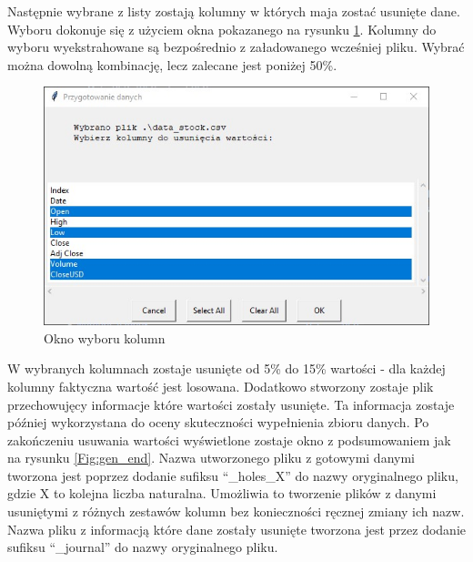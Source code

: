 \documentclass[12pt,twoside]{article}
\begin{document}
Następnie wybrane z listy zostają kolumny w których maja zostać usunięte dane.
Wyboru dokonuje się z użyciem okna pokazanego na rysunku \ref{Fig:gen_col}.
Kolumny do wyboru wyekstrahowane są bezpośrednio z załadowanego wcześniej pliku.
Wybrać można dowolną kombinację, lecz zalecane jest poniżej 50\%.

\begin{figure}[ht]
    \centering
    \includegraphics[width=12cm]{img/03.jpg}
    \caption{Okno wyboru kolumn}
    \label{Fig:gen_col}
\end{figure}
\FloatBarrier

W wybranych kolumnach zostaje usunięte od 5\%
do 15\% wartości - dla każdej kolumny faktyczna wartość jest losowana.
Dodatkowo stworzony zostaje plik przechowujęcy informacje które wartości zostały usunięte.
Ta informacja zostaje później wykorzystana do oceny skuteczności wypełnienia zbioru danych.
Po zakończeniu usuwania wartości wyświetlone zostaje okno z podsumowaniem jak na rysunku \ref{Fig:gen_end}.
Nazwa utworzonego pliku z gotowymi danymi tworzona jest
poprzez dodanie sufiksu ``\_holes\_X'' do nazwy oryginalnego pliku, gdzie X to kolejna liczba naturalna.
Umożliwia to tworzenie plików z danymi usuniętymi z różnych zestawów kolumn bez konieczności ręcznej zmiany ich nazw.
Nazwa pliku z informacją które dane zostały usunięte tworzona jest
przez dodanie sufiksu ``\_journal'' do nazwy oryginalnego pliku.
\end{document}
